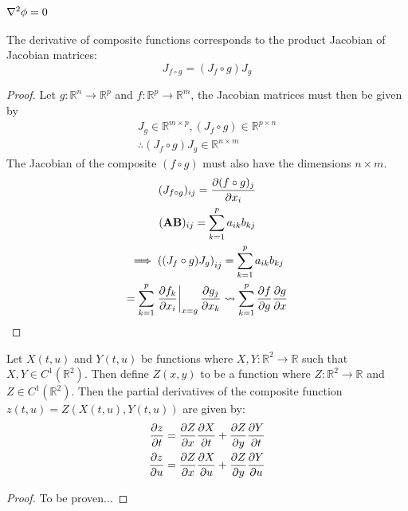 \subsubsection{$\laplacian{\phi}=0$}\label{sec:deltaphizero}
\begin{lemma}
	The derivative of composite functions corresponds to the product Jacobian of Jacobian matrices:
	$$J_{f\circ g}=(J_f\circ g)J_g$$
\end{lemma}
\begin{proof}
	Let $g:\mathbb{R}^n\rightarrow\mathbb{R}^p$ and $f:\mathbb{R}^p\rightarrow\mathbb{R}^m$, the Jacobian matrices must then be given by
	\begin{gather*}
		J_g\in\mathbb{R}^{m\times p},(J_f\circ g)\in\mathbb{R}^{p\times n}\\
		\therefore(J_f\circ g)J_g\in\mathbb{R}^{n\times m}
	\end{gather*}
	The Jacobian of the composite $(f\circ g)$ must also have the dimensions $n\times m$.
	\begin{gather*}
		(J_{f\circ g})_{ij}=\pdv{(f\circ g)_j}{x_i}\\
		(\mathbf{A}\mathbf{B})_{ij}=\sum_{k=1}^pa_{ik}b_{kj}\\
		\implies\left((J_f\circ g)J_g\right)_{ij}=\sum_{k=1}^pa_{ik}b_{kj}\\
		=\sum_{k=1}^p\eval{\pdv{f_k}{x_i}}_{x=g}\pdv{g_j}{x_k}\leadsto\sum_{k=1}^p\pdv{f}{g}\pdv{g}{x}
	\end{gather*}
\end{proof}

\begin{lemma}
Let $X(t,u)$ and $Y(t,u)$ be functions where $X,Y:\mathbb{R}^2\rightarrow\mathbb{R}$ such that $X,Y\in C^1(\mathbb{R}^2)$. Then define $Z(x,y)$ to be a function where $Z:\mathbb{R}^2\rightarrow\mathbb{R}$ and $Z\in C^1(\mathbb{R}^2)$. Then the partial derivatives of the composite function $z(t,u)=Z(X(t,u),Y(t,u))$ are given by:
\begin{align*}
	\pdv{z}{t}&=\pdv{Z}{x}\pdv{X}{t}+\pdv{Z}{y}\pdv{Y}{t}\\
	\pdv{z}{u}&=\pdv{Z}{x}\pdv{X}{u}+\pdv{Z}{y}\pdv{Y}{u}
\end{align*}
\end{lemma}
\begin{proof}
	To be proven...
\end{proof}

